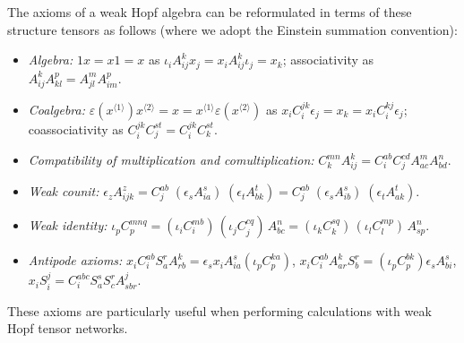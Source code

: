 \documentclass[a4paper,11pt]{article}
\theoremstyle{theorem}
\theoremstyle{remark}
\begin{document}
The axioms of a weak Hopf algebra can be reformulated in terms of these structure tensors as follows (where we adopt the Einstein summation convention):
\begin{itemize}
\item \emph{Algebra:} $1x = x1 = x$ as $\iota_i A_{ij}^{k} x_j = x_i A_{ij}^{k} \iota_j = x_k$; associativity as $A_{ij}^{k} A_{kl}^{p} = A_{jl}^{m} A_{im}^{p}$.

\item \emph{Coalgebra:} $\varepsilon(x^{\langle 1\rangle})x^{\langle 2\rangle} = x = x^{\langle 1\rangle} \varepsilon(x^{\langle 2\rangle})$ as $x_i C_i^{jk} \epsilon_j = x_k = x_i C_i^{kj} \epsilon_j$; coassociativity as $C_i^{jk} C_j^{st} = C_i^{jk} C_k^{st}$.


\item \emph{Compatibility of multiplication and comultiplication:} 
\(
C_k^{mn} A_{ij}^{k} = C_i^{ab} C_j^{cd} A_{ac}^{m} A_{bd}^{n}.
\)

\item \emph{Weak counit:} 
\(
\epsilon_z A_{ijk}^z 
= C_j^{ab} \; (\epsilon_s A_{i a}^{s}) \; (\epsilon_t A_{b k}^{t})
= C_j^{ab} \; (\epsilon_s A_{i b}^{s}) \; (\epsilon_t A_{a k}^{t}).
\)

\item \emph{Weak identity:} 
\(
\iota_p C_p^{mnq}
= (\iota_i C_i^{mb}) \, (\iota_j C_j^{cq}) \, A_{bc}^{n} 
= (\iota_k C_k^{sq}) \, (\iota_l C_l^{mp}) \, A_{sp}^{n}.
\)

\item \emph{Antipode axioms:}
\(
x_iC_i^{ab} S_a^r A_{rb}^{k} = \epsilon_s x_i A_{ia}^{s} (\iota_p C_p^{ka})\), 
\(x_iC_i^{ab} A_{ar}^{k} S_b^r = (\iota_p C_p^{bk}) \epsilon_s A_{bi}^{s}\),
\(
x_i S_i^j = C_i^{abc} S_a^s S_c^r A_{sbr}^{j}.
\)
\end{itemize}
These axioms are particularly useful when performing calculations with weak Hopf tensor networks.
\end{document}
